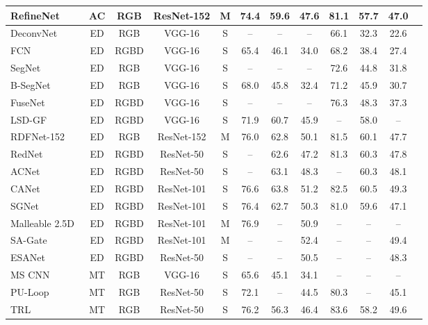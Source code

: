\documentclass[10pt,twocolumn,letterpaper]{article}
\begin{document}
\begin{table*}[!t]
\begin{center}
{\begin{tabular}{lccccccccccc}
				RefineNet~\cite{Lin:TPAMI20}     & AC & RGB  & ResNet-152 & M & 74.4 & 59.6 & 47.6 & 81.1 & 57.7 & 47.0 \\
				\midrule
				DeconvNet~\cite{Noh:ICCV15}      & ED & RGB  & VGG-16     & S & --   & --   & --   & 66.1 & 32.3 & 22.6 \\
				FCN~\cite{Shelhamer:TPAMI17}     & ED & RGBD & VGG-16     & S & 65.4 & 46.1 & 34.0 & 68.2 & 38.4 & 27.4 \\
				SegNet~\cite{Badri:TPAMI17}      & ED & RGB  & VGG-16     & S & --   & --   & --   & 72.6 & 44.8 & 31.8 \\
				B-SegNet~\cite{Kendall:BMVC17}   & ED & RGB  & VGG-16     & S & 68.0 & 45.8 & 32.4 & 71.2 & 45.9 & 30.7 \\
				FuseNet~\cite{Hazirbas:ACCV17}   & ED & RGBD & VGG-16     & S & --   & --   & --   & 76.3 & 48.3 & 37.3 \\
				LSD-GF~\cite{Cheng:CVPR17}       & ED & RGBD & VGG-16     & S & 71.9 & 60.7 & 45.9 & --   & 58.0 & --   \\
				RDFNet-152~\cite{Lee:ICCV17}     & ED & RGB  & ResNet-152 & M & 76.0 & 62.8 & 50.1 & 81.5 & 60.1 & 47.7 \\
				RedNet~\cite{Jiang:arXiv18}      & ED & RGBD & ResNet-50  & S & --   & 62.6 & 47.2 & 81.3 & 60.3 & 47.8 \\
				ACNet~\cite{Hu:ICIP19}           & ED & RGBD & ResNet-50  & S & --   & 63.1 & 48.3 & --   & 60.3 & 48.1 \\
				CANet~\cite{Zhou:ACCV20}         & ED & RGBD & ResNet-101 & S & 76.6 & 63.8 & 51.2 & 82.5 & 60.5 & 49.3 \\
				SGNet~\cite{Chen:arXiv20}        & ED & RGBD & ResNet-101 & S & 76.4 & 62.7 & 50.3 & 81.0 & 59.6 & 47.1 \\
				Malleable 2.5D~\cite{Xing:ECCV20}& ED & RGBD & ResNet-101 & M & 76.9 & --   & 50.9 & --   & --   & --   \\
				SA-Gate~\cite{Chen:ECCV20}       & ED & RGBD & ResNet-101 & M & --   & --   & 52.4 & -- & --   & 49.4 \\
				ESANet~\cite{Seichter:arXiv20}   & ED & RGBD & ResNet-50  & S & --   & --   & 50.5 & --   & --   & 48.3   \\
				\midrule
				MS CNN~\cite{Eigen:ICCV15}       & MT & RGB  & VGG-16     & S & 65.6 & 45.1 & 34.1 & --   & --   & --   \\
				PU-Loop~\cite{Kong:CVPR18}       & MT & RGB  & ResNet-50  & S & 72.1 & --   & 44.5 & 80.3 & --   & 45.1 \\
				TRL~\cite{Zhang:ECCV18}          & MT & RGB  & ResNet-50  & S & 76.2 & 56.3 & 46.4 & 83.6 & 58.2 & 49.6 \\

\end{tabular}}
\end{center}
\end{table*}
\end{document}

